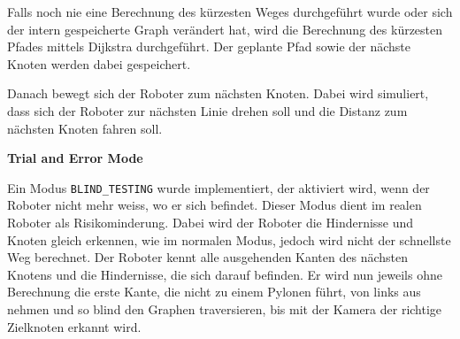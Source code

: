 Falls noch nie eine Berechnung des kürzesten Weges durchgeführt wurde oder sich der intern gespeicherte Graph verändert hat, wird die Berechnung des kürzesten Pfades mittels Dijkstra durchgeführt. Der geplante Pfad sowie der nächste Knoten werden dabei gespeichert.

Danach bewegt sich der Roboter zum nächsten Knoten. Dabei wird simuliert, dass sich der Roboter zur nächsten Linie drehen soll und die Distanz zum nächsten Knoten fahren soll.







\textbf{Trial and Error Mode}

Ein Modus \verb|BLIND_TESTING| wurde implementiert, der aktiviert wird, wenn der Roboter nicht mehr weiss, wo er sich befindet. Dieser Modus dient im realen Roboter als Risikominderung. Dabei wird der Roboter die Hindernisse und Knoten gleich erkennen, wie im normalen Modus, jedoch wird nicht der schnellste Weg berechnet. Der Roboter kennt alle ausgehenden Kanten des nächsten Knotens und die Hindernisse, die sich darauf befinden. Er wird nun jeweils ohne Berechnung die erste Kante, die nicht zu einem Pylonen führt, von links aus nehmen und so blind den Graphen traversieren, bis mit der Kamera der richtige Zielknoten erkannt wird.


